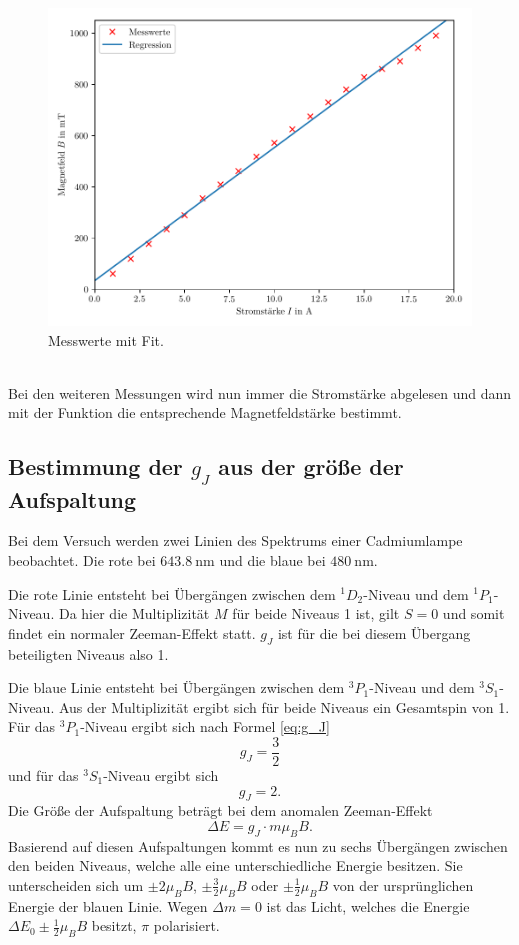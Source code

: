\documentclass[
  bibliography=totoc,     %
  captions=tableheading,  %
  titlepage=firstiscover, %
]{scrartcl}
\begin{document}
\begin{figure}
  \centering
  \includegraphics[width=\textwidth]{plot.pdf}
  \caption{Messwerte mit Fit.}
  \label{fig:eichkurve}
\end{figure}\\
Bei den weiteren Messungen wird nun immer die Stromstärke abgelesen und dann mit der
Funktion die entsprechende Magnetfeldstärke bestimmt.
\clearpage
\subsection{Bestimmung der $g_J$ aus der größe der Aufspaltung}
Bei dem Versuch werden zwei Linien des Spektrums einer Cadmiumlampe beobachtet.
Die rote bei $\SI{643.8}{\nano\meter}$ und die blaue bei $\SI{480}{\nano\meter}$.

\noindent
Die rote Linie entsteht bei Übergängen zwischen dem $^1D_2$-Niveau und dem $^1P_1$-Niveau.
Da hier die Multiplizität $M$ für beide Niveaus 1 ist, gilt $S=0$ und somit findet ein
normaler Zeeman-Effekt statt. $g_J$ ist für die bei diesem Übergang beteiligten Niveaus also 1.

\noindent
Die blaue Linie entsteht bei Übergängen zwischen dem $^3P_1$-Niveau und dem $^3S_1$-Niveau.
Aus der Multiplizität ergibt sich für beide Niveaus ein Gesamtspin von 1.
Für das $^3P_1$-Niveau ergibt sich nach Formel \eqref{eq:g_J}
\begin{equation*}
  g_J = \frac{3}{2}
\end{equation*}
und für das $^3S_1$-Niveau ergibt sich
\begin{equation*}
  g_J = 2.
\end{equation*}
Die Größe der Aufspaltung beträgt bei dem anomalen Zeeman-Effekt
\begin{equation}
  \Delta E = g_J \cdot m \mu_B  B.
\end{equation}
Basierend auf diesen Aufspaltungen kommt es nun zu sechs Übergängen zwischen den beiden
Niveaus, welche alle eine unterschiedliche Energie besitzen.
Sie unterscheiden sich um $\pm 2 \mu_B B$, $\pm \frac{3}{2} \mu_B B$ oder $\pm \frac{1}{2} \mu_B B$
von der ursprünglichen Energie der blauen Linie.
Wegen $\Delta m = 0$ ist das Licht, welches die Energie $\Delta E_0 \pm \frac{1}{2} \mu_B B$ besitzt, $\pi$ polarisiert.\\
\end{document}
